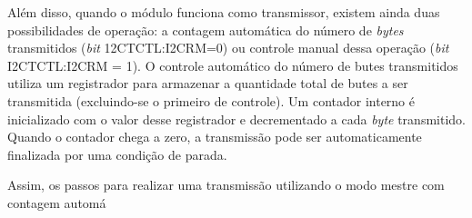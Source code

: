 		Além disso, quando o módulo funciona como transmissor, existem ainda duas possibilidades de operação: a contagem automática do número de \textit{bytes} transmitidos (\textit{bit} 12CTCTL:I2CRM=0) ou controle manual dessa operação (\textit{bit} I2CTCTL:I2CRM = 1). O controle automático do número de butes transmitidos utiliza um registrador para armazenar a quantidade total de butes a ser transmitida (excluindo-se o primeiro de controle). Um contador interno é inicializado com o valor desse registrador e decrementado a cada \textit{byte} transmitido. Quando o contador chega a zero, a transmissão pode ser automaticamente finalizada por uma condição de parada.
		
		Assim, os passos para realizar uma transmissão utilizando o modo mestre com contagem automá
		
			
		
		
		 
		
		